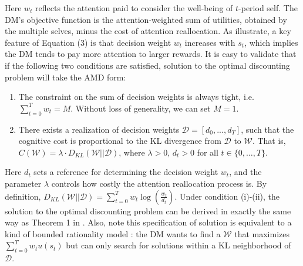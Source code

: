 \documentclass[
  12pt,
]{article}
\begin{document}
Here \(w_t\) reflects the attention paid to consider the well-being of
\(t\)-period self. The DM's objective function is the attention-weighted
sum of utilities, obtained by the multiple selves, minus the cost of
attention reallocation. As \citet{noor2022optimal,noor2024constrained}
illustrate, a key feature of Equation (3) is that decision weight
\(w_t\) increases with \(s_t\), which implies the DM tends to pay more
attention to larger rewards. It is easy to validate that if the
following two conditions are satisfied, solution to the optimal
discounting problem will take the AMD form:

\begin{enumerate}
\def\labelenumi{(\roman{enumi})}
\item
  The constraint on the sum of decision weights is always tight, i.e.
  \(\sum_{t=0}^Tw_t=M\). Without loss of generality, we can set \(M=1\).
\item
  There exists a realization of decision weights
  \(\mathcal{D}=[d_0,...,d_T]\), such that the cognitive cost is
  proportional to the KL divergence from \(\mathcal{D}\) to
  \(\mathcal{W}\). That is,
  \(C(\mathcal{W})= \lambda\cdot D_{KL}(\mathcal{W}||\mathcal{D})\),
  where \(\lambda>0\), \(d_t>0\) for all \(t\in\{0,…,T\}\).
\end{enumerate}

Here \(d_t\) sets a reference for determining the decision weight
\(w_t\), and the parameter \(\lambda\) controls how costly the attention
reallocation process is. By definition,
\(D_{KL}(\mathcal{W}||\mathcal{D})=\sum_{t=0}^Tw_t\log(\frac{w_t}{d_t})\).
Under condition (i)-(ii), the solution to the optimal discounting
problem can be derived in exactly the same way as Theorem 1 in
\citet{matvejka2015rational}. Also, note this specification of solution
is equivalent to a kind of bounded rationality model
\citep{todorov2009efficient}: the DM wants to find a \(\mathcal{W}\)
that maximizes \(\sum_{t=0}^Tw_tu(s_t)\) but can only search for
solutions within a KL neighborhood of \(\mathcal{D}\).
\end{document}
